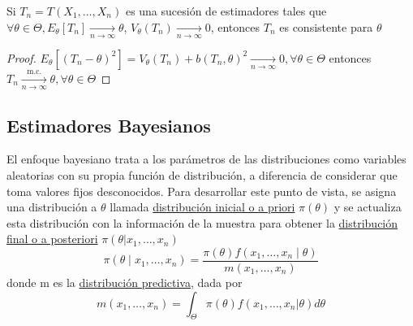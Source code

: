 \begin{proposición}
Si $T_{n} = T(X_1, \ldots, X_n)$ es una sucesión de estimadores tales que $\forall \theta \in \Theta, E_{\theta}[T_n] \underset{n \to \infty}{\longrightarrow} \theta$, $V_{\theta}(T_n) \underset{n \to \infty}{\longrightarrow} 0$, entonces $T_n$ es consistente para $\theta$
\end{proposición}
\begin{proof}
  $E_{\theta}\left[\left(T_{n}-\theta\right)^{2}\right]=V_{\theta}\left(T_{n}\right)+b\left(T_{n}, \theta\right)^{2} \underset{n \rightarrow \infty}{\longrightarrow} 0, \forall \theta \in \Theta$ entonces $T_{n} \xrightarrow[n \rightarrow \infty]{\text { m.c. }} \theta, \forall \theta \in \Theta$
\end{proof}



\subsection{Estimadores Bayesianos}

\begin{definición}
El enfoque bayesiano trata a los parámetros de las distribuciones como variables aleatorias con su propia función de distribución, a diferencia de considerar que toma valores fijos desconocidos. Para desarrollar este punto de vista, se asigna una distribución a $\theta$ llamada \underline{distribución inicial o a priori} $\pi(\theta)$ y se actualiza esta distribución con la información de la muestra para obtener la \underline{distribución final o a posteriori} $\pi(\theta | x_1, \ldots, x_n)$
$$\pi\left(\theta \mid x_{1}, \ldots, x_{n}\right)=\frac{\pi(\theta) f\left(x_{1}, \ldots, x_{n} \mid \theta\right)}{m\left(x_{1}, \ldots, x_{n}\right)}$$
donde m es la \underline{distribución predictiva}, dada por
$$m(x_1, \ldots, x_n) = \int_{\Theta} \pi(\theta)f(x_1, \ldots, x_n | \theta)d\theta$$
\end{definición}

